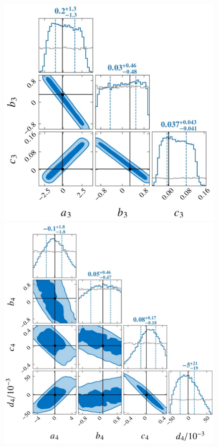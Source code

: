 \documentclass[a4paper,11pt]{article}
\begin{document}
\begin{figure}[t]
    \begin{minipage}[t]{0.49\textwidth}
    \centering
    \includegraphics[width=0.8\linewidth]{fig_Hyper_parameter_3d.pdf}
    \end{minipage}
    \hfill
    \begin{minipage}[t]{0.49\textwidth}
    \centering
    \includegraphics[width=0.8\linewidth]{fig_Hyper_parameter_4d.pdf}
    \end{minipage}
    \vspace{3mm}

\end{figure}
\end{document}

